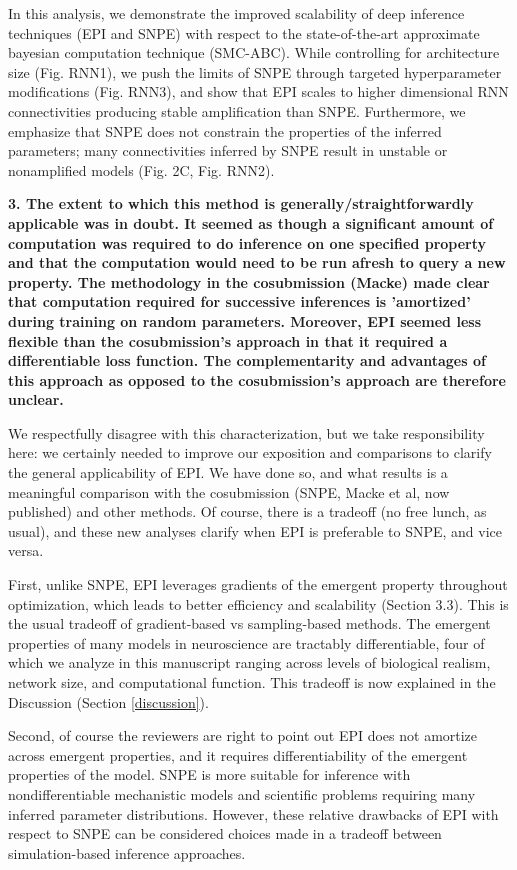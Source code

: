 \documentclass[11pt,a4paper]{article}
\begin{document}
In this analysis, we demonstrate the improved scalability of deep inference techniques (EPI and SNPE) with respect to the state-of-the-art approximate bayesian computation technique (SMC-ABC).
While controlling for architecture size (Fig. RNN1), we push the limits of SNPE through targeted hyperparameter modifications (Fig. RNN3), and show that EPI scales to higher dimensional RNN connectivities producing stable amplification than SNPE.
Furthermore, we emphasize that SNPE does not constrain the properties of the inferred parameters; many connectivities inferred by SNPE result in unstable or nonamplified models (Fig. 2C, Fig. RNN2).

\textbf{3. The extent to which this method is generally/straightforwardly applicable was in doubt. It seemed as though a significant amount of computation was required to do inference on one specified property and that the computation would need to be run afresh to query a new property. The methodology in the cosubmission (Macke) made clear that computation required for successive inferences is 'amortized' during training on random parameters. Moreover, EPI seemed less flexible than the cosubmission's approach in that it required a differentiable loss function. The complementarity and advantages of this approach as opposed to the cosubmission's approach are therefore unclear. } 

We respectfully disagree with this characterization, but we take responsibility here: we certainly needed to improve our exposition and comparisons to clarify the general applicability of EPI.  We have done so, and what results is a meaningful comparison with the cosubmission (SNPE, Macke et al, now published) and other methods.  Of course, there is a tradeoff (no free lunch, as usual), and these new analyses clarify when EPI is preferable to SNPE, and vice versa.  

First, unlike SNPE, EPI leverages gradients of the emergent property throughout optimization, which leads to better efficiency and scalability (Section 3.3).   This is the usual tradeoff of gradient-based vs sampling-based methods.  The emergent properties of many models in neuroscience are tractably differentiable, four of which we analyze in this manuscript ranging across levels of biological realism, network size, and computational function. This tradeoff is now explained in the Discussion (Section \ref{discussion}).

Second, of course the reviewers are right to point out EPI does not amortize across emergent properties, and it requires differentiability of the emergent properties of the model.  SNPE is more suitable for inference with nondifferentiable mechanistic models and scientific problems requiring many inferred parameter distributions.  
However, these relative drawbacks of EPI with respect to SNPE can be considered choices made in a tradeoff between simulation-based inference approaches.  
\end{document}
